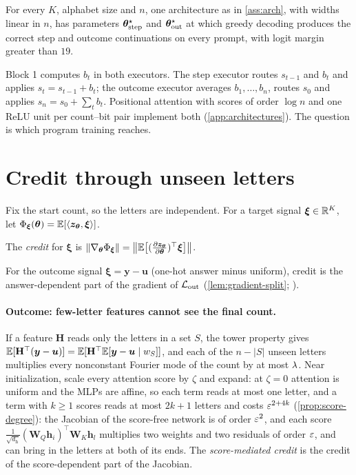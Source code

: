 \begin{proposition}
\label{prop:represent}
For every $K$, alphabet size and $n$, one architecture as in \cref{ass:arch}, with widths linear in $n$, has parameters
$\bm\theta^\star_{\mathrm{step}}$ and $\bm\theta^\star_{\mathrm{out}}$ at which greedy decoding produces the correct step and outcome continuations on every prompt, with
logit margin greater than $19$.
\end{proposition}
\label{sec:exact-programs}
Block 1 computes $b_t$ in both executors. The step executor routes $s_{t-1}$ and $b_t$ and applies $s_t=s_{t-1}+b_t$; the outcome executor
averages $b_1,\ldots,b_n$, routes $s_0$ and applies $s_n=s_0+\sum_tb_t$. Positional attention with scores of order $\log n$ and one ReLU
unit per count--bit pair implement both (\cref{app:architectures}). The question is which program training reaches.

\section{Credit through unseen letters}
\label{sec:credit}

Fix the start count, so the letters are independent. For a target signal $\bm\xi\in\mathbb R^K$, let $\Phi_{\bm\xi}(\bm\theta)=\mathbb E[\langle\bm z_{\bm\theta},\bm\xi\rangle]$.

\begin{definition}[Credit]
\label{def:credit}
The \emph{credit} for $\bm\xi$ is $\|\nabla_{\bm\theta}\cred_{\bm\xi}\|=\bigl\|\E\bigl[(\Jz)^\top\bm\xi\bigr]\bigr\|$.
\end{definition}
For the outcome signal $\bm\xi=\bm y-\bm u$ (one-hot answer minus uniform), credit is the answer-dependent part of the gradient of
$\mathcal L_{\mathrm{out}}$ (\cref{lem:gradient-split}; \citealp{shalevshwartz2017failures,abbe2025parities}).

\paragraph{Outcome: few-letter features cannot see the final count.} If a feature $\mathbf H$ reads only the letters in a set $S$, the tower
property gives $\mathbb E[\mathbf H^\top(\bm y-\bm u)]=\mathbb E[\mathbf H^\top\mathbb E[\bm y-\bm u\mid w_S]]$, and each of the $n-|S|$ unseen letters multiplies every
nonconstant Fourier mode of the count by at most $\lambda$. Near initialization, scale every attention score by $\zeta$ and expand: at
$\zeta=0$ attention is uniform and the MLPs are affine, so each term reads at most one letter, and a term with $k\ge1$ scores reads at most
$2k+1$ letters and costs $\varepsilon^{2+4k}$ (\cref{prop:score-degree}): the Jacobian of the score-free network is of order
$\varepsilon^2$, and each score $\frac{1}{\sqrt{d_{\mathrm h}}}(\mathbf W_Q\bm h_i)^\top\mathbf W_K\bm h_l$ multiplies two weights and two residuals of order
$\varepsilon$, and can bring in the letters at both of its ends. The \emph{score-mediated credit} is the credit of the score-dependent
part of the Jacobian.

